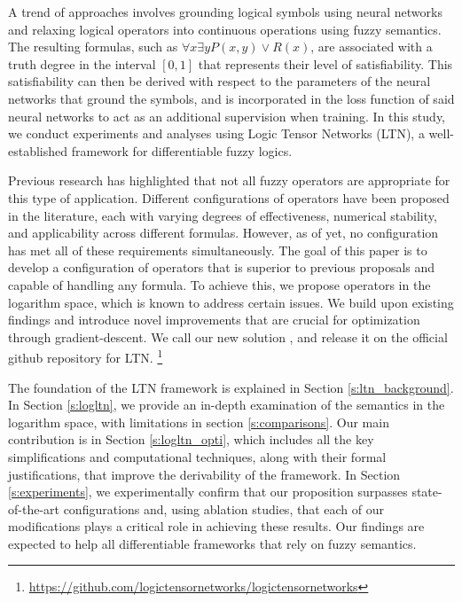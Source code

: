 \documentclass{article}
\theoremstyle{definition}
\begin{document}
A trend of approaches involves grounding logical symbols using neural networks and relaxing logical operators into continuous operations using fuzzy semantics.
The resulting formulas, such as $\forall x \exists y P(x,y) \lor R(x)$, are associated with a truth degree in the interval $[0,1]$ that represents their level of satisfiability. 
This satisfiability can then be derived with respect to the parameters of the neural networks that ground the symbols, 
and is incorporated in the loss function of said neural networks to act as an additional supervision when training. 
In this study, we conduct experiments and analyses using Logic Tensor Networks (LTN), a well-established framework for differentiable fuzzy logics. 

Previous research has highlighted that not all fuzzy operators are appropriate for this type of application. 
Different configurations of operators have been proposed in the literature, each with varying degrees of effectiveness, numerical stability, and applicability across different formulas. 
However, as of yet, no configuration has met all of these requirements simultaneously. 
The goal of this paper is to develop a configuration of operators that is superior to previous proposals and capable of handling any formula. 
To achieve this, we propose operators in the logarithm space, which is known to address certain issues.
We build upon existing findings and introduce novel improvements that are crucial for optimization through gradient-descent. 
We call our new solution \logLTN, and release it on the official github repository for LTN.
\footnote{\url{https://github.com/logictensornetworks/logictensornetworks}}

The foundation of the LTN framework is explained in Section \ref{s:ltn_background}.
In Section \ref{s:logltn}, we provide an in-depth examination of the semantics in the logarithm space, with limitations in section \ref{s:comparisons}. 
Our main contribution is in Section \ref{s:logltn_opti}, which includes all the key simplifications and computational techniques, along with their formal justifications, that improve the derivability of the framework.
In Section \ref{s:experiments}, we experimentally confirm that our proposition surpasses state-of-the-art configurations and, using ablation studies, that each of our modifications plays a critical role in achieving these results.
Our findings are expected to help all differentiable frameworks that rely on fuzzy semantics.
\end{document}
